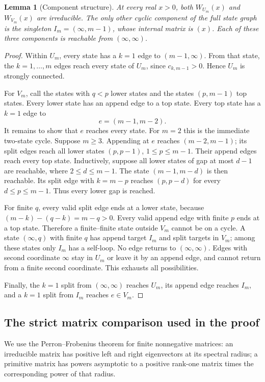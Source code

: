 \documentclass[11pt,a4paper]{article}
\newtheorem{lemma}[lemma]{Lemma}
\theoremstyle{definition}\newaliascnt{definition}{theorem}
\theoremstyle{remark}\newaliascnt{remark}{theorem}
\begin{document}
\begin{lemma}[Component structure]\label{lem:components}
At every real $x>0$, both $W_{U_m}(x)$ and $W_{V_m}(x)$ are irreducible.
The only other cyclic component of the full state graph is the singleton
$I_m=(\infty,m-1)$, whose internal matrix is $(x)$. Each of these three
components is reachable from $(\infty,\infty)$.
\end{lemma}
\begin{proof}
Within $U_m$, every state has a $k=1$ edge to $(m-1,\infty)$. From that state,
the $k=1,\ldots,m$ edges reach every state of $U_m$, since
$c_{k,m-1}>0$. Hence $U_m$ is strongly connected.

For $V_m$, call the states with $q<p$ lower states and the states
$(p,m-1)$ top states. Every lower state has an append edge to a top state.
Every top state has a $k=1$ edge to
\[
 e=(m-1,m-2).
\]
It remains to show that $e$ reaches every state. For $m=2$ this is the
immediate two-state cycle. Suppose $m\ge3$. Appending at $e$ reaches
$(m-2,m-1)$; its split edges reach all lower states $(p,p-1)$, $1\le p\le m-1$.
Their append edges reach every top state. Inductively, suppose all lower
states of gap at most $d-1$ are reachable, where $2\le d\le m-1$.
The state $(m-1,m-d)$ is then reachable. Its split edge with $k=m-p$ reaches
$(p,p-d)$ for every $d\le p\le m-1$. Thus every lower gap is reached.

For finite $q$, every valid split edge ends at a lower state, because
$(m-k)-(q-k)=m-q>0$. Every valid append edge with finite $p$ ends at a top
state. Therefore a finite--finite state outside $V_m$ cannot be on a cycle.
A state $(\infty,q)$ with finite $q$ has append target $I_m$ and split
targets in $V_m$; among these states only $I_m$ has a self-loop. No edge
returns to $(\infty,\infty)$. Edges with second coordinate $\infty$ stay
in $U_m$ or leave it by an append edge, and cannot return from a finite
second coordinate. This exhausts all possibilities.

Finally, the $k=1$ split from $(\infty,\infty)$ reaches $U_m$, its append
edge reaches $I_m$, and a $k=1$ split from $I_m$ reaches $e\in V_m$.
\end{proof}

\subsection{The strict matrix comparison used in the proof}
We use the Perron--Frobenius theorem for finite nonnegative matrices: an
irreducible matrix has positive left and right eigenvectors at its spectral
radius; a primitive matrix has powers asymptotic to a positive rank-one
matrix times the corresponding power of that radius.
\end{document}
